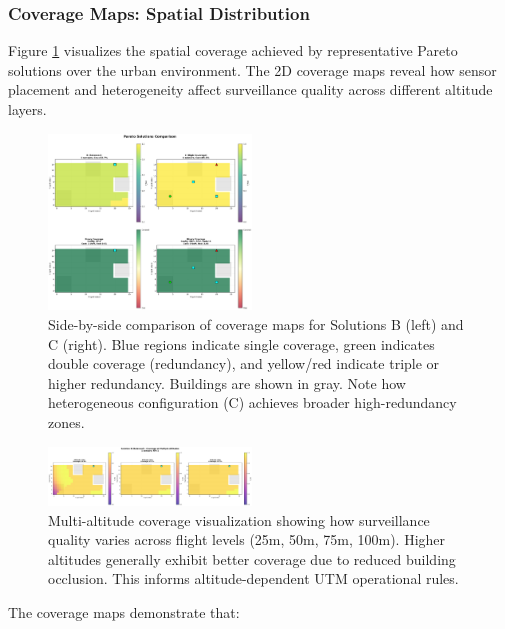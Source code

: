 \subsubsection{Coverage Maps: Spatial Distribution}

Figure \ref{fig:coverage_maps} visualizes the spatial coverage achieved by representative Pareto solutions over the urban environment. The 2D coverage maps reveal how sensor placement and heterogeneity affect surveillance quality across different altitude layers.

\begin{figure}[t]
  \centering
  \includegraphics[width=0.48\textwidth]{figures/pareto_comparison.png}
  \caption{Side-by-side comparison of coverage maps for Solutions B (left) and C (right). Blue regions indicate single coverage, green indicates double coverage (redundancy), and yellow/red indicate triple or higher redundancy. Buildings are shown in gray. Note how heterogeneous configuration (C) achieves broader high-redundancy zones.}
  \label{fig:coverage_maps}
\end{figure}

\begin{figure}[t]
  \centering
  \includegraphics[width=0.48\textwidth]{figures/pareto_multi_altitude.png}
  \caption{Multi-altitude coverage visualization showing how surveillance quality varies across flight levels (25m, 50m, 75m, 100m). Higher altitudes generally exhibit better coverage due to reduced building occlusion. This informs altitude-dependent UTM operational rules.}
  \label{fig:multi_altitude}
\end{figure}

The coverage maps demonstrate that:

